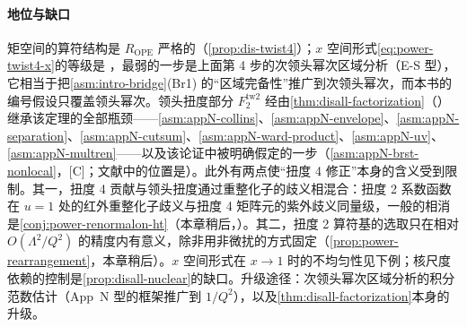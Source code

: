 \paragraph{地位与缺口}
矩空间的算符结构是 $R_{\mathrm{OPE}}$ 严格的（\cref{prop:dis-twist4}）；$x$ 空间形式\eqref{eq:power-twist4-x}的等级是 \tagA，最弱的一步是上面第 4 步的次领头幂次区域分析（E-S 型），它相当于把\cref{asm:intro-bridge}(Br1) 的“区域完备性”推广到次领头幂次，而本书的编号假设只覆盖领头幂次。领头扭度部分 $F_2^{\mathrm{tw2}}$ 经由\cref{thm:disall-factorization}（\tagA）继承该定理的全部瓶颈——\cref{asm:appN-collins}、\cref{asm:appN-envelope}、\cref{asm:appN-separation}、\cref{asm:appN-cutsum}、\cref{asm:appN-ward-product}、\cref{asm:appN-uv}、\cref{asm:appN-multren}——以及该论证中被明确假定的一步（\cref{asm:appN-brst-nonlocal}，[C]；文献中的位置是\cite[第~11.3.2~节]{Collins2011}）。此外有两点使“扭度 4 修正”本身的含义受到限制。其一，扭度 4 贡献与领头扭度通过重整化子的歧义相混合：扭度 2 系数函数在 $u=1$ 处的红外重整化子歧义与扭度 4 矩阵元的紫外歧义同量级，一般的相消是\cref{conj:power-renormalon-ht}（本章稍后，\tagC）。其二，扭度 2 算符基的选取只在相对 $O(\Lambda^2/Q^2)$ 的精度内有意义，除非用非微扰的方式固定（\cref{prop:power-rearrangement}，本章稍后）。$x$ 空间形式在 $x\to1$ 时的不均匀性见下例；核尺度依赖的控制是\cref{prop:disall-nuclear}的缺口。升级途径：次领头幂次区域分析的积分范数估计（App~N 型的框架推广到 $1/Q^2$），以及\cref{thm:disall-factorization}本身的升级。

